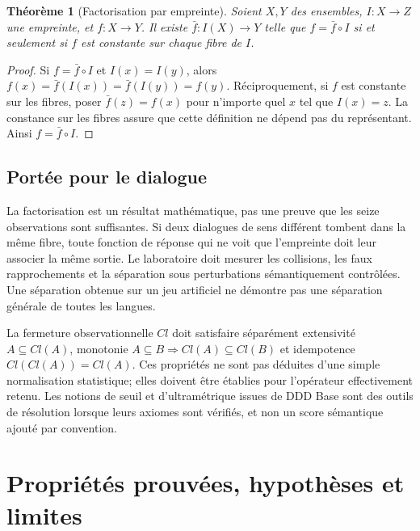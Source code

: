 \documentclass[11pt,a4paper]{report}
\newtheorem{theorem}[definition]{Théorème}
\begin{document}
\begin{theorem}[Factorisation par empreinte]
Soient $X,Y$ des ensembles, $I:X\to Z$ une empreinte, et $f:X\to Y$. Il existe $\bar f:I(X)\to Y$ telle que $f=\bar f\circ I$ si et seulement si $f$ est constante sur chaque fibre de $I$.
\end{theorem}
\begin{proof}
Si $f=\bar f\circ I$ et $I(x)=I(y)$, alors $f(x)=\bar f(I(x))=\bar f(I(y))=f(y)$. Réciproquement, si $f$ est constante sur les fibres, poser $\bar f(z)=f(x)$ pour n'importe quel $x$ tel que $I(x)=z$. La constance sur les fibres assure que cette définition ne dépend pas du représentant. Ainsi $f=\bar f\circ I$.
\end{proof}

\section{Portée pour le dialogue}
La factorisation est un résultat mathématique, pas une preuve que les seize observations sont suffisantes. Si deux dialogues de sens différent tombent dans la même fibre, toute fonction de réponse qui ne voit que l'empreinte doit leur associer la même sortie. Le laboratoire doit mesurer les collisions, les faux rapprochements et la séparation sous perturbations sémantiquement contrôlées. Une séparation obtenue sur un jeu artificiel ne démontre pas une séparation générale de toutes les langues.

La fermeture observationnelle $Cl$ doit satisfaire séparément extensivité $A\subseteq Cl(A)$, monotonie $A\subseteq B\Rightarrow Cl(A)\subseteq Cl(B)$ et idempotence $Cl(Cl(A))=Cl(A)$. Ces propriétés ne sont pas déduites d'une simple normalisation statistique; elles doivent être établies pour l'opérateur effectivement retenu. Les notions de seuil et d'ultramétrique issues de DDD Base sont des outils de résolution lorsque leurs axiomes sont vérifiés, et non un score sémantique ajouté par convention.

\chapter{Propriétés prouvées, hypothèses et limites}
\end{document}
